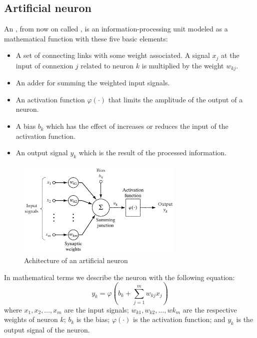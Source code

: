 \subsection{Artificial neuron}
An , from now on called , is an
information-processing unit modeled as a mathematical
function with these five basic elements:
\begin{itemize}
    \item A set of connecting links with some weight associated.
    A signal $x_j$ at the input of connexion $j$ related to neuron $k$ is multiplied by the weight $w_{kj}$.
    \item An adder for summing the weighted input signals.
    \item An activation function $\varphi(\cdot)$ that limits the amplitude of the output of a neuron.
    \item A bias $b_k$ which has the effect of increases or reduces the input of the activation function.
    \item An output signal $y_k$ which is the result of the processed information.
\end{itemize}

\begin{figure}[hbtp]
\begin{center}
\includegraphics[width=300]{img/artificial_neuron.png}
\end{center}
\caption[Artificial neuron diagram]
{Achitecture of an artificial neuron}
\label{fig:AN}
\end{figure}

In mathematical terms we describe the neuron with the following equation:
\begin{equation}
    y_k=\varphi(b_k+\sum\limits_{j=1}^m w_{kj} x_j)
\end{equation}
where $x_1, x_2, \dots, x_m$ are the input signals;
$w_{k1}, w_{k2}, \dots, wk_m$ are the respective weights of neuron $k$;
$b_k$ is the bias;
$\varphi(\cdot)$ is the activation function;
and $y_k$ is the output signal of the neuron.

